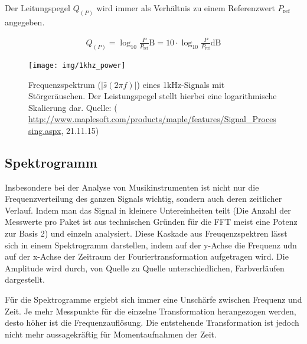 Der Leitungspegel $Q_{(P)}$ wird immer als Verhältnis zu einem Referenzwert $ P_{\text{ref}} $ angegeben.

\begin{align}
  Q_{(P)} = \log_{10}{\frac{P}{P_{\text{ref}}}} \text{B} = 10 \cdot \log_{10}{\frac{P}{P_{\text{ref}}}} \text{dB}
\end{align}

\begin{figure}
  \centering
  \texttt{[image: img/1khz\_power]}
  \caption{Frequenzspektrum ($ \left| \hat{s}(2 \pi f) \right| $) eines 1kHz-Signals mit Störgeräuschen. Der Leistungspegel stellt hierbei eine logarithmische Skalierung dar. Quelle: (\url{ http://www.maplesoft.com/products/maple/features/Signal_Processing.aspx},  21.11.15)}
  \label{img:1khz_power}
\end{figure}

\subsection{Spektrogramm}
Insbesondere bei der Analyse von Musikinstrumenten ist nicht nur die Frequenzverteilung des ganzen Signals wichtig, sondern auch deren zeitlicher Verlauf. Indem man das Signal in kleinere Untereinheiten teilt (Die Anzahl der Messwerte pro Paket ist aus technischen Gründen für die FFT meist eine Potenz zur Basis 2) und einzeln analysiert. Diese Kaskade aus Freuqenzspektren lässt sich in einem Spektrogramm darstellen, indem auf der y-Achse die Frequenz udn auf der x-Achse der Zeitraum der Fouriertransformation aufgetragen wird. Die Amplitude wird durch, von Quelle zu Quelle unterschiedlichen, Farbverläufen dargestellt.

Für die Spektrogramme ergiebt sich immer eine Unschärfe zwischen Frequenz und Zeit. Je mehr Messpunkte für die einzelne Transformation herangezogen werden, desto höher ist die Frequenzauflösung. Die entstehende Transformation ist jedoch nicht mehr aussagekräftig für Momentaufnahmen der Zeit.
